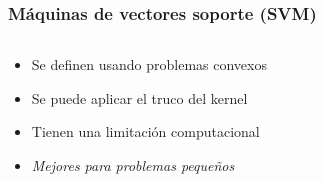 \documentclass[aspectratio=43,spanish]{beamer}
\begin{document}




\begin{frame}
      \frametitle{Máquinas de vectores soporte (SVM)}

      \begin{columns}
            \begin{column}{0.5\textwidth}
                  \begin{itemize}
                        \item Se definen usando problemas convexos
                        \item Se puede aplicar el truco del kernel
                  \end{itemize}
                  \begin{itemize}
                        \item Tienen una limitación computacional
                        \item \emph{Mejores para problemas pequeños}
                  \end{itemize}
                  

\end{column}
\end{columns}
\end{frame}
\end{document}
